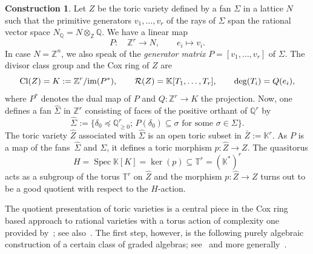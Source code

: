 \documentclass[pdftex]{sigma}%
\theoremstyle{definition}
\newtheorem{construction}[thm]{Construction}
\def\Cl{{\rm Cl}}
\def\KK{{\mathbb K}}
\def\TT{{\mathbb T}}
\def\ZZ{{\mathbb Z}}
\def\QQ{{\mathbb Q}}
\def\im{{\rm im}}
\def\Spec{\operatorname{Spec}}
\def\im{{\rm im}}
\numberwithin{equation}{section}
\begin{document}
\begin{construction}
\label{constr:coxtoric}
Let $Z$ be the toric variety defined by
a fan $\Sigma$ in a lattice $N$ such that
the primitive generators $v_1,\dots, v_r$
of the rays of $\Sigma$ span the
rational vector space $N_\QQ = N \otimes_\ZZ \QQ$.
We have a linear map
\[
P \colon \quad \ZZ^r \to N,\qquad
e_i \mapsto v_i.
\]
In case $N = \ZZ^n$, we also speak
of the \emph{generator matrix}
$P = [v_1, \dots, v_r]$ of $\Sigma$.
The divisor class group and the Cox ring
of $Z$ are
\[
\Cl(Z) = K := \ZZ^r / \im(P^*),
\qquad
\mathcal{R}(Z) = \KK[T_1,\dots,T_r],
\qquad \deg(T_i) = Q(e_i),
\]
where $P^*$ denotes the dual map of $P$ and
$Q \colon \ZZ^r \to K$ the projection.
Now, one defines a fan $\hat \Sigma$ in $\ZZ^r$
consisting of faces of the positive orthant
of $\QQ^r$ by
\[
\hat \Sigma
 :=
\{\delta_0 \preceq \QQ_{\ge 0}^r; \,
P(\delta_0) \subseteq \sigma \text{ for some } \sigma \in \Sigma\}.
\]
The toric variety $\hat Z$ associated with $\hat \Sigma$
is an open toric subset in $\bar Z := \KK^r$.
As $P$ is a map of the fans~$\hat \Sigma$ and
$\Sigma$, it defines a toric morphism
$p \colon \hat Z \to Z$.
The quasitorus
\[
H = \Spec \KK[K] = \ker(p) \subseteq \TT^r = (\KK^*)^r
\]
acts as a subgroup of the torus $\TT^r$ on $\hat Z$ and the
morphism $p \colon \hat Z \to Z$ turns out to
be a good quotient with respect to the $H$-action.
\end{construction}


The quotient presentation of toric varieties is
a central piece in the Cox ring based approach
to rational varieties with a torus action of
complexity one provided by~\cite{HaHe,HaSu};
see also~\cite[Section~3.4]{ArDeHaLa}.
The first step, however, is the following purely
algebraic construction of a certain class of graded
algebras; see~\cite[Construction~3.4.2.1]{ArDeHaLa}
and more generally~\cite[Constructions~3.5 and~6.3]{HaHiWr}.
\end{document}
